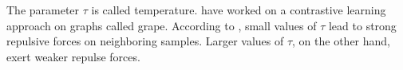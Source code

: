 The parameter $\tau$ is called temperature.
\citet{grape_2024} have worked on a contrastive learning approach on graphs called \ac{grape}.
According to \citeauthor{grape_2024}, small values of $\tau$ lead to strong repulsive forces on neighboring samples.
Larger values of $\tau$, on the other hand, exert weaker repulse forces.

\citet{wang_understanding_2021}